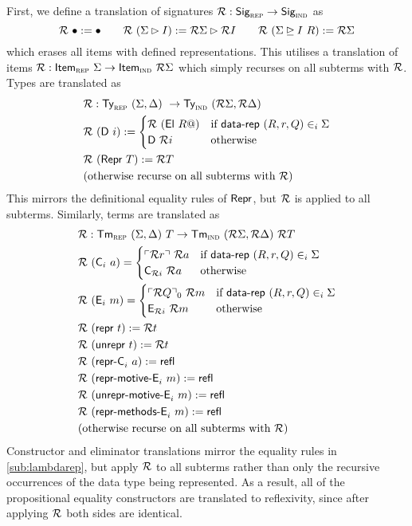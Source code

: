 First, we define a translation of signatures $\mathcal{R} : \textsf{Sig}_{\textsc{rep}} \to \textsf{Sig}_{\textsc{ind}}$ as
\[
\mathcal{R}\ \bullet := \bullet \qquad \mathcal{R}\ (\Sigma \rhd I) := \mathcal{R} \Sigma \rhd \mathcal{R} I \qquad \mathcal{R}\ (\Sigma \unrhd I \ R) := \mathcal{R} \Sigma
\]
which erases all items with defined representations.
This utilises a translation of items $\mathcal{R} : \textsf{Item}_{\textsc{rep}}\ \Sigma \to \textsf{Item}_{\textsc{ind}}\ \mathcal{R}
\Sigma$ which simply recurses on all subterms with $\mathcal{R}$.
Types are translated as
\begin{align*}
  & \mathcal{R} : \textsf{Ty}_{\textsc{rep}}\ (\Sigma, \Delta)\ \to \textsf{Ty}_{\textsc{ind}}\ (\mathcal{R} \Sigma, \mathcal{R} \Delta) \\
  & \mathcal{R}\ (\textsf{D}\ i) := \begin{cases}
  \mathcal{R}\ (\textsf{El}\ R@) & \text{if $\textsf{data-rep}\ (R, r, Q) \in_i \Sigma$} \\
  \textsf{D}\ \mathcal{R} i & \text{otherwise}
  \end{cases} \\
  & \mathcal{R}\ (\textsf{Repr}\ T) := \mathcal{R} T \\
  & \text{(otherwise recurse on all subterms with $\mathcal{R}$)}
\end{align*}
This mirrors the definitional equality rules of $\textsf{Repr}$, but $\mathcal{R}$ is applied
to all subterms.
Similarly, terms are translated as
\begin{align*}
  & \mathcal{R} : \textsf{Tm}_{\textsc{rep}}\ (\Sigma, \Delta)\ T \to \textsf{Tm}_{\textsc{ind}}\ (\mathcal{R} \Sigma, \mathcal{R} \Delta)\ \mathcal{R} T \\
  &\mathcal{R}\ (\textsf{C}_i\ a) = \begin{cases}
      \ulcorner \mathcal{R} r \urcorner\ \mathcal{R} a & \text{if}\ \textsf{data-rep}\ (R, r, Q) \in_i \Sigma \\
      \textsf{C}_{\mathcal{R} i}\ \mathcal{R} a & \text{otherwise}
  \end{cases} \\
  &\mathcal{R}\ (\textsf{E}_i\ m) = \begin{cases}
      \ulcorner \mathcal{R} Q \urcorner_0\ \mathcal{R} m & \text{if}\ \textsf{data-rep}\ (R, r, Q) \in_i \Sigma \\
      \textsf{E}_{\mathcal{R} i}\ \mathcal{R} m & \text{otherwise}
  \end{cases} \\
  & \mathcal{R}\ (\textsf{repr}\ t) := \mathcal{R} t \\
  & \mathcal{R}\ (\textsf{unrepr}\ t) := \mathcal{R} t \\
  & \mathcal{R}\ (\textsf{repr-C}_i\ a) := \textsf{refl} \\
  & \mathcal{R}\ (\textsf{repr-motive-E}_i\ m) := \textsf{refl} \\
  & \mathcal{R}\ (\textsf{unrepr-motive-E}_i\ m) := \textsf{refl} \\
  & \mathcal{R}\ (\textsf{repr-methods-E}_i\ m) := \textsf{refl} \\
  & \text{(otherwise recurse on all subterms with $\mathcal{R}$)}
\end{align*}
Constructor and eliminator translations mirror the equality rules in
\cref{sub:lambdarep}, but apply $\mathcal{R}$ to all subterms rather than only the
recursive occurrences of the data type being represented. As a result, all of
the propositional equality constructors are translated to reflexivity, since
after applying $\mathcal{R}$ both sides are identical.

